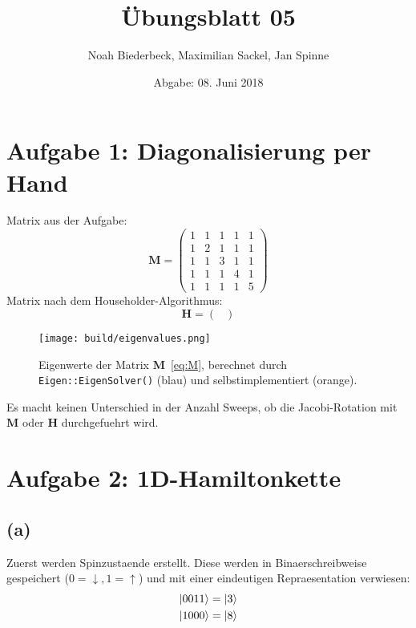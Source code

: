 \documentclass{scrartcl}
\title{Übungsblatt 05}
\author{%
		Noah Biederbeck, Maximilian Sackel, Jan Spinne
}
\date{Abgabe: 08. Juni 2018}
\begin{document}
\maketitle

\section*{Aufgabe 1: Diagonalisierung per Hand}
Matrix aus der Aufgabe:
\begin{equation}
  \label{eq:M}
  \mathbf{M} = \left(\begin{matrix}
      1 & 1 & 1 & 1 & 1 \\
      1 & 2 & 1 & 1 & 1 \\
      1 & 1 & 3 & 1 & 1 \\
      1 & 1 & 1 & 4 & 1 \\
      1 & 1 & 1 & 1 & 5
  \end{matrix}\right)
\end{equation}
Matrix nach dem Householder-Algorithmus:
\begin{equation}
  \label{eq:H}
  \mathbf{H} = \left(\begin{matrix}
    
\end{matrix}\right)
\end{equation}
\begin{figure}[ht]
  \centering
  \texttt{[image: build/eigenvalues.png]}
  \caption{Eigenwerte der Matrix $\mathbf{M}$~\eqref{eq:M}, berechnet durch \texttt{Eigen::EigenSolver()} (blau) und selbstimplementiert (orange).}%
  \label{fig:eigenvalues}
\end{figure}
Es macht keinen Unterschied in der Anzahl Sweeps, ob die Jacobi-Rotation mit $\mathbf{M}$ oder $\mathbf{H}$ durchgefuehrt wird.

\section*{Aufgabe 2: 1D-Hamiltonkette}
\subsection*{(a)}
Zuerst werden Spinzustaende erstellt.
Diese werden in Binaerschreibweise gespeichert ($0 = \downarrow, 1 = \uparrow$) und mit einer eindeutigen Repraesentation verwiesen:
\begin{align*}
  \ket{0 0 1 1} &= \ket{3} \\
  \ket{1 0 0 0} &= \ket{8} \\
\end{align*}
\end{document}

